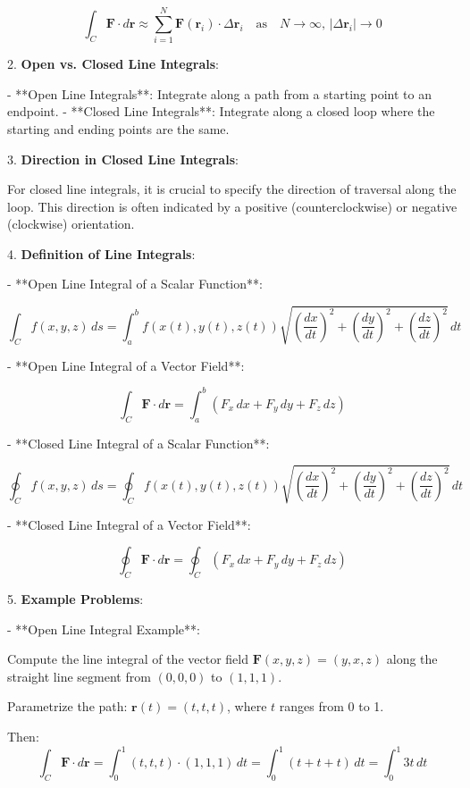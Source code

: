 \documentclass[12pt]{article}
\begin{document}
\[
\int_C \mathbf{F} \cdot d\mathbf{r} \approx \sum_{i=1}^N \mathbf{F}(\mathbf{r}_i) \cdot \Delta \mathbf{r}_i \quad \text{as} \quad N \to \infty, \, |\Delta \mathbf{r}_i| \to 0
\]

2. \textbf{Open vs. Closed Line Integrals}:

- **Open Line Integrals**: Integrate along a path from a starting point to an endpoint.
- **Closed Line Integrals**: Integrate along a closed loop where the starting and ending points are the same.

3. \textbf{Direction in Closed Line Integrals}:

For closed line integrals, it is crucial to specify the direction of traversal along the loop. This direction is often indicated by a positive (counterclockwise) or negative (clockwise) orientation.

4. \textbf{Definition of Line Integrals}:

- **Open Line Integral of a Scalar Function**:

\[
\int_C f(x, y, z) \, ds = \int_a^b f(x(t), y(t), z(t)) \sqrt{\left( \frac{dx}{dt} \right)^2 + \left( \frac{dy}{dt} \right)^2 + \left( \frac{dz}{dt} \right)^2} \, dt
\]

- **Open Line Integral of a Vector Field**:

\[
\int_C \mathbf{F} \cdot d\mathbf{r} = \int_a^b \left( F_x \, dx + F_y \, dy + F_z \, dz \right)
\]

- **Closed Line Integral of a Scalar Function**:

\[
\oint_C f(x, y, z) \, ds = \oint_C f(x(t), y(t), z(t)) \sqrt{\left( \frac{dx}{dt} \right)^2 + \left( \frac{dy}{dt} \right)^2 + \left( \frac{dz}{dt} \right)^2} \, dt
\]

- **Closed Line Integral of a Vector Field**:

\[
\oint_C \mathbf{F} \cdot d\mathbf{r} = \oint_C \left( F_x \, dx + F_y \, dy + F_z \, dz \right)
\]

5. \textbf{Example Problems}:

- **Open Line Integral Example**:

  Compute the line integral of the vector field \(\mathbf{F}(x, y, z) = (y, x, z)\) along the straight line segment from \((0, 0, 0)\) to \((1, 1, 1)\).

  Parametrize the path: \(\mathbf{r}(t) = (t, t, t)\), where \( t \) ranges from 0 to 1.

  Then:
  \[
  \int_C \mathbf{F} \cdot d\mathbf{r} = \int_0^1 \left( t, t, t \right) \cdot \left( 1, 1, 1 \right) \, dt = \int_0^1 (t + t + t) \, dt = \int_0^1 3t \, dt
  \]
\end{document}
